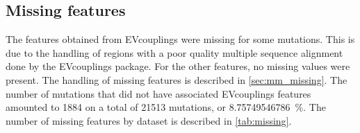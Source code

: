 \subsection{Missing features}
The features obtained from EVcouplings were missing for some mutations.
This is due to the handling of regions with a poor quality multiple sequence alignment done by the EVcouplings package.
For the other features, no missing values were present.
The handling of missing features is described in \autoref{sec:mm_missing}.
The number of mutations that did not have associated EVcouplings features amounted to \num{1884} on a total of \num{21513} mutations, or \SI{8.75749546786}{\percent}.
The number of missing features by dataset is described in \autoref{tab:missing}.

\begin{table}[t]
	\small%
	{\caption[Number of mutations with missing features]{%
			\textbf{Number of mutations with missing features.}
			Table that shows the number of mutations in each dataset that could not be assigned EVcouplings predictions.
			EVcouplings predictions were the only feature that presented some missing values.
		}\label{tab:missing}%
	}%
\end{table}

